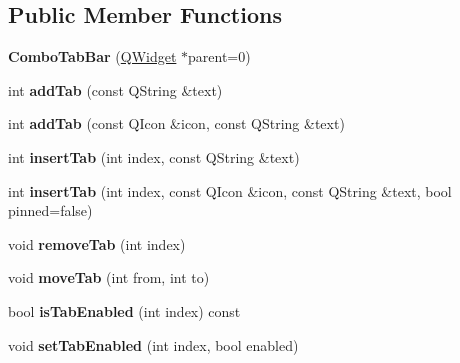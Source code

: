 \subsection*{Public Member Functions}
\begin{DoxyCompactItemize}
\item 
\hypertarget{class_combo_tab_bar_ad215b46a7b36de7254e84a5faeda3271}{
{\bfseries ComboTabBar} (\hyperlink{class_q_widget}{QWidget} $\ast$parent=0)}
\label{class_combo_tab_bar_ad215b46a7b36de7254e84a5faeda3271}

\item 
\hypertarget{class_combo_tab_bar_a0778ead49aac16e76a52e064d4456e38}{
int {\bfseries addTab} (const QString \&text)}
\label{class_combo_tab_bar_a0778ead49aac16e76a52e064d4456e38}

\item 
\hypertarget{class_combo_tab_bar_aa9d7ea42b1140110816427d054573c22}{
int {\bfseries addTab} (const QIcon \&icon, const QString \&text)}
\label{class_combo_tab_bar_aa9d7ea42b1140110816427d054573c22}

\item 
\hypertarget{class_combo_tab_bar_a217ce12ede48579d0093224c056bc22b}{
int {\bfseries insertTab} (int index, const QString \&text)}
\label{class_combo_tab_bar_a217ce12ede48579d0093224c056bc22b}

\item 
\hypertarget{class_combo_tab_bar_aadb37fbf2993cb630e38f1e5e8babb9f}{
int {\bfseries insertTab} (int index, const QIcon \&icon, const QString \&text, bool pinned=false)}
\label{class_combo_tab_bar_aadb37fbf2993cb630e38f1e5e8babb9f}

\item 
\hypertarget{class_combo_tab_bar_a4ea37ffc1a20344bb381ebe476290c73}{
void {\bfseries removeTab} (int index)}
\label{class_combo_tab_bar_a4ea37ffc1a20344bb381ebe476290c73}

\item 
\hypertarget{class_combo_tab_bar_a3461f38651ae174bd65fe74c2afb74a1}{
void {\bfseries moveTab} (int from, int to)}
\label{class_combo_tab_bar_a3461f38651ae174bd65fe74c2afb74a1}

\item 
\hypertarget{class_combo_tab_bar_aa0a9af0b7c063804dd7e7c5a2f410e6a}{
bool {\bfseries isTabEnabled} (int index) const }
\label{class_combo_tab_bar_aa0a9af0b7c063804dd7e7c5a2f410e6a}

\item 
\hypertarget{class_combo_tab_bar_adec9ff85e73e28ca1446a5ed906a9465}{
void {\bfseries setTabEnabled} (int index, bool enabled)}
\label{class_combo_tab_bar_adec9ff85e73e28ca1446a5ed906a9465}


\end{DoxyCompactItemize}
